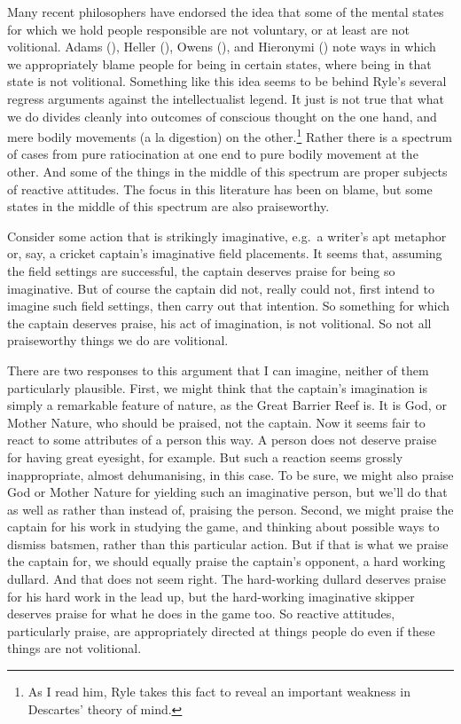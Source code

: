 \documentclass[
  11pt,
  letterpaper,
  DIV=11,
  numbers=noendperiod,
  twoside]{scrartcl}
\begin{document}
Many recent philosophers have endorsed the idea that some of the mental
states for which we hold people responsible are not voluntary, or at
least are not volitional. Adams (), Heller
(), Owens
(), and Hieronymi
() note ways in which we appropriately
blame people for being in certain states, where being in that state is
not volitional. Something like this idea seems to be behind Ryle's
several regress arguments against the intellectualist legend. It just is
not true that what we do divides cleanly into outcomes of conscious
thought on the one hand, and mere bodily movements (a la digestion) on
the other.\footnote{As I read him, Ryle takes this fact to reveal an
  important weakness in Descartes' theory of mind.} Rather there is a
spectrum of cases from pure ratiocination at one end to pure bodily
movement at the other. And some of the things in the middle of this
spectrum are proper subjects of reactive attitudes. The focus in this
literature has been on blame, but some states in the middle of this
spectrum are also praiseworthy.

Consider some action that is strikingly imaginative, e.g.~a writer's apt
metaphor or, say, a cricket captain's imaginative field placements. It
seems that, assuming the field settings are successful, the captain
deserves praise for being so imaginative. But of course the captain did
not, really could not, first intend to imagine such field settings, then
carry out that intention. So something for which the captain deserves
praise, his act of imagination, is not volitional. So not all
praiseworthy things we do are volitional.

There are two responses to this argument that I can imagine, neither of
them particularly plausible. First, we might think that the captain's
imagination is simply a remarkable feature of nature, as the Great
Barrier Reef is. It is God, or Mother Nature, who should be praised, not
the captain. Now it seems fair to react to some attributes of a person
this way. A person does not deserve praise for having great eyesight,
for example. But such a reaction seems grossly inappropriate, almost
dehumanising, in this case. To be sure, we might also praise God or
Mother Nature for yielding such an imaginative person, but we'll do that
as well as rather than instead of, praising the person. Second, we might
praise the captain for his work in studying the game, and thinking about
possible ways to dismiss batsmen, rather than this particular action.
But if that is what we praise the captain for, we should equally praise
the captain's opponent, a hard working dullard. And that does not seem
right. The hard-working dullard deserves praise for his hard work in the
lead up, but the hard-working imaginative skipper deserves praise for
what he does in the game too. So reactive attitudes, particularly
praise, are appropriately directed at things people do even if these
things are not volitional.
\end{document}
